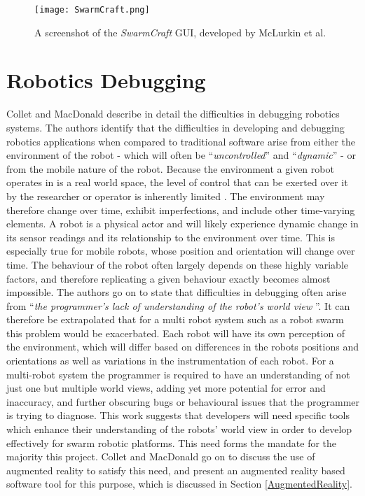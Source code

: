 \begin{figure}
 \begin{center}
 \texttt{[image: SwarmCraft.png]}
 \decoRule
 \caption[Swarm Craft GUI. \cite{McLurkin:2006}]{A screenshot of the \textit{SwarmCraft} GUI, developed by McLurkin et al. \cite{McLurkin:2006}}
 \label{fig:SwarmCraft}
 \end{center}
\end{figure}


\section{Robotics Debugging} \label{RoboticsDebugging}
Collet and MacDonald \cite{Collet:2006} describe in detail the difficulties in debugging robotics systems. The authors identify that the difficulties in developing and debugging robotics applications when compared to traditional software arise from either the environment of the robot - which will often be ``\textit{uncontrolled}'' and ``\textit{dynamic}'' - or from the mobile nature of the robot. Because the environment a given robot operates in is a real world space, the level of control that can be exerted over it by the researcher or operator is inherently limited \cite{Collet:2006}. The environment may therefore change over time, exhibit imperfections, and include other time-varying elements. A robot is a physical actor and will likely experience dynamic change in its sensor readings and its relationship to the environment over time. This is especially true for mobile robots, whose position and orientation will change over time. The behaviour of the robot often largely depends on these highly variable factors, and therefore replicating a given behaviour exactly becomes almost impossible. The authors go on to state that difficulties in debugging often arise from ``\textit{the programmer's lack of understanding of the robot's world view} \cite{Collet:2006}''. It can therefore be extrapolated that for a multi robot system such as a robot swarm this problem would be exacerbated. Each robot will have its own perception of the environment, which will differ based on differences in the robots positions and orientations as well as variations in the instrumentation of each robot. For a multi-robot system the programmer is required to have an understanding of not just one but multiple world views, adding yet more potential for error and inaccuracy, and further obscuring bugs or behavioural issues that the programmer is trying to diagnose. This work \cite{Collet:2006} suggests that developers will need specific tools which enhance their understanding of the robots' world view in order to develop effectively for swarm robotic platforms. This need forms the mandate for the majority this project. Collet and MacDonald \cite{Collet:2006} go on to discuss the use of augmented reality to satisfy this need, and present an augmented reality based software tool for this purpose, which is discussed in Section \ref{AugmentedReality}.

